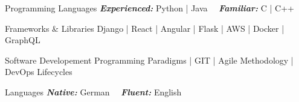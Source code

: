 
\begin{cvskills}
  \cvskill
    {Programming Languages} %
    {\textbf{\emph{Experienced:}} Python | Java  \ \ \textbf{\emph{Familiar:}} C | C++} %

  \cvskill
    {Frameworks \& Libraries} %
    {Django | React | Angular | Flask | AWS | Docker | GraphQL} %

  \cvskill
    {Software Developement} %
    {Programming Paradigms | GIT | Agile Methodology | DevOps Lifecycles} %

  \cvskill
    {Languages} %
    {\textbf{\emph{Native:}} German \ \ \textbf{\emph{Fluent:}} English} %
\end{cvskills}